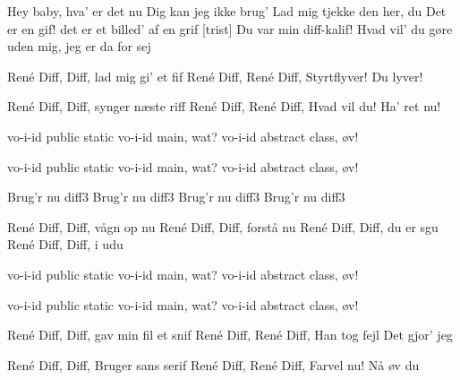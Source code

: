 \documentclass[a4paper,11pt]{article}
\begin{document}
\begin{song}
 Hey baby, hva' er det nu
 Dig kan jeg ikke brug'
 Lad mig tjekke den her, du 
 Det er en gif!
  det er et billed' af en grif
[trist] Du var min diff-kalif!
 Hvad vil' du gøre uden mig, jeg er da for sej

 René Diff, Diff,
lad mig gi' et fif
René Diff, René Diff,
Styrtflyver!
 Du lyver!

 René Diff, Diff,
synger næste riff
René Diff, René Diff,
Hvad vil du!
 Ha' ret nu!

 vo-i-id public static
vo-i-id main, wat?
vo-i-id abstract class, øv!

 vo-i-id public static
vo-i-id main, wat?
vo-i-id abstract class, øv!

 Brug'r nu diff3
Brug'r nu diff3
Brug'r nu diff3
Brug'r nu diff3

 René Diff, Diff,
vågn op nu
René Diff, Diff,
forstå nu
René Diff, Diff,
du er sgu
René Diff, Diff,
 i udu

 vo-i-id public static
vo-i-id main, wat?
vo-i-id abstract class, øv!

 vo-i-id public static
vo-i-id main, wat?
vo-i-id abstract class, øv!

 René Diff, Diff,
gav min fil et snif
René Diff, René Diff,
Han tog fejl
 Det gjor' jeg

 René Diff, Diff,
Bruger sans serif
René Diff, René Diff,
Farvel nu!
 Nå øv du

\end{song}
\end{document}
